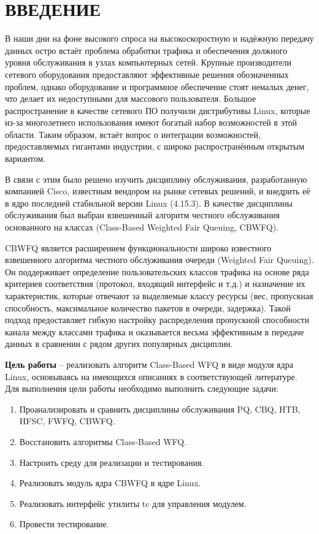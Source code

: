 \section*{ВВЕДЕНИЕ}

В наши дни на фоне высокого спроса на высокоскоростную и надёжную передачу данных
остро встаёт проблема обработки трафика и обеспечения должного уровня обслуживания
в узлах компьютерных сетей. Крупные производители сетевого оборудования
предоставляют эффективные решения обозначенных проблем, однако оборудование и программное
обеспечение стоят немалых денег, что делает их недоступными для массового пользователя.
Большое распространение в качестве сетевого ПО получили дистрибутивы Linux,
которые из-за многолетнего использования имеют богатый набор возможностей в этой области.
Таким образом, встаёт вопрос о интеграции возможностей,
предоставляемых гигантами индустрии, с широко распространённым открытым вариантом.

В связи с этим было решено изучить дисциплину обслуживания, разработанную компанией Cisco,
известным вендором на рынке сетевых решений, и внедрить её в ядро последней стабильной версии Linux (4.15.3). 
В качестве дисциплины обслуживания был выбран взвешенный алгоритм честного
обслуживания основанного на классах (Class-Based Weighted Fair Queuing, CBWFQ).

CBWFQ является расширением функциональности широко известного взвешенного алгоритма
честного обслуживания очереди (Weighted Fair Queuing). Он поддерживает
определение пользовательских классов трафика на основе ряда критериев соответствия
(протокол, входящий интерфейс и т.д.) и назначение их характеристик, которые
отвечают за выделяемые классу ресурсы (вес, пропускная способность, максимальное
количество пакетов в очереди, задержка). Такой подход предоставляет гибкую настройку
распределения пропускной способности канала между классами трафика и оказывается весьма
эффективным в передаче данных в сравнении с рядом других популярных дисциплин.


\textbf{Цель работы} -- реализовать алгоритм Class-Based WFQ в виде модуля ядра Linux, основываясь на имеющихся
описаниях в соответствующей литературе. 
Для выполнения цели работы необходимо выполнить следующие задачи:
\begin{enumerate}
    \item Проанализировать и сравнить дисциплины обслуживания PQ, CBQ, HTB, HFSC, FWFQ, CBWFQ.
    \item Восстановить алгоритмы Class-Based WFQ.
    \item Настроить среду для реализации и тестирования.
    \item Реализовать модуль ядра CBWFQ в ядре Linux.
    \item Реализовать интерфейс утилиты tc для управления модулем.
    \item Провести тестирование.
\end{enumerate}

